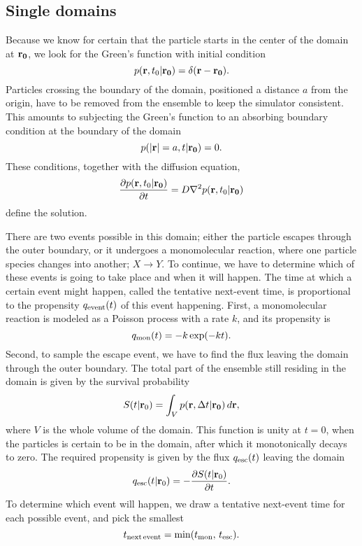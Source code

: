 \subsection{Single domains}
Because we know for certain that the particle starts in the center of the domain at ${\bf r_0}$, we look for the Green's function with initial condition
\begin{equation}
 p({\bf r}, t_0|{\bf r_0}) = \delta(\mathbf{r - r_0}).
\end{equation}
Particles crossing the boundary of the domain, positioned a distance $a$ from the origin, have to be removed from the ensemble to keep the simulator consistent. This amounts to subjecting the Green's function to an absorbing boundary condition at the boundary of the domain
\begin{equation}
 p({\bf |r|}=a, t|{\bf r_0}) = 0.
\end{equation}
These conditions, together with the diffusion equation, 
\begin{equation}
 \frac{\partial p({\bf r}, t_0|{\bf r_0})}{\partial t} = D \nabla^2 p({\bf r}, t_0|{\bf r_0})
\end{equation}
define the solution. 

There are two events possible in this domain; either the particle escapes through the outer boundary, or it undergoes a monomolecular reaction, where one particle species changes into another; $X\rightarrow Y$. To continue, we have to determine which of these events is going to take place and when it will happen. The time at which a certain event might happen, called the tentative next-event time, is proportional to the propensity $q_{\rm event}(t)$ of this event happening. First, a monomolecular reaction is modeled as a Poisson process with a rate $k$, and its propensity is
\begin{equation}
 q_{\rm mon}(t) = -k\, {\rm exp}(-k t).
\end{equation}
Second, to sample the escape event, we have to find the flux leaving the domain through the outer boundary. The total part of the ensemble still residing in the domain is given by the survival probability
\begin{equation}
 S(t|{\mathbf r_0}) = \int_V p({\bf r}, \Delta t|{\bf r_0}) \, d{\mathbf r},
 \elabel{Surv}
\end{equation}
where $V$ is the whole volume of the domain. This function is unity at $t=0$, when the particles is certain to be in the domain, after which it monotonically decays to zero. The required propensity is given by the flux $q_{\rm esc}(t)$ leaving the domain
\begin{equation}
 q_{\rm esc}(t|{\mathbf r_0}) = -\pdiff{S(t|{\mathbf r_0})}{t}.
 \elabel{Sflux}
\end{equation}
To determine which event will happen, we draw a tentative next-event time for each possible event, and pick the smallest
\begin{equation}
 t_{\rm next\,event} = {\rm min}(t_{\rm mon},\,t_{\rm esc}).
\end{equation}

